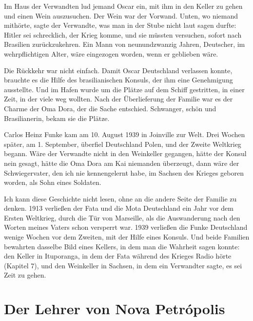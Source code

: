 \documentclass[
  ngerman,
  11pt,
  openany]{book}
\begin{document}
Im Haus der Verwandten lud jemand Oscar ein, mit ihm in den Keller zu
gehen und einen Wein auszusuchen. Der Wein war der Vorwand. Unten, wo
niemand mithörte, sagte der Verwandte, was man in der Stube nicht laut
sagen durfte: Hitler sei schrecklich, der Krieg komme, und sie müssten
versuchen, sofort nach Brasilien zurückzukehren. Ein Mann von
neunundzwanzig Jahren, Deutscher, im wehrpflichtigen Alter, wäre
eingezogen worden, wenn er geblieben wäre.

Die Rückkehr war nicht einfach. Damit Oscar Deutschland verlassen
konnte, brauchte es die Hilfe des brasilianischen Konsuls, der ihm eine
Genehmigung ausstellte. Und im Hafen wurde um die Plätze auf dem Schiff
gestritten, in einer Zeit, in der viele weg wollten. Nach der
Überlieferung der Familie war es der Charme der Oma Dora, der die Sache
entschied. Schwanger, schön und Brasilianerin, bekam sie die Plätze.

Carlos Heinz Funke kam am 10. August 1939 in Joinville zur Welt. Drei
Wochen später, am 1. September, überfiel Deutschland Polen, und der
Zweite Weltkrieg begann. Wäre der Verwandte nicht in den Weinkeller
gegangen, hätte der Konsul nein gesagt, hätte die Oma Dora am Kai
niemanden überzeugt, dann wäre der Schwiegervater, den ich nie
kennengelernt habe, im Sachsen des Krieges geboren worden, als Sohn
eines Soldaten.

Ich kann diese Geschichte nicht lesen, ohne an die andere Seite der
Familie zu denken. 1913 verließen der Fata und die Mota Deutschland ein
Jahr vor dem Ersten Weltkrieg, durch die Tür von Marseille, als die
Auswanderung nach den Worten meines Vaters schon versperrt war. 1939
verließen die Funke Deutschland wenige Wochen vor dem Zweiten, mit der
Hilfe eines Konsuls. Und beide Familien bewahrten dasselbe Bild eines
Kellers, in dem man die Wahrheit sagen konnte: den Keller in Ituporanga,
in dem der Fata während des Krieges Radio hörte (Kapitel 7), und den
Weinkeller in Sachsen, in dem ein Verwandter sagte, es sei Zeit zu
gehen.

\section{Der Lehrer von Nova
Petrópolis}\label{der-lehrer-von-nova-petruxf3polis}
\end{document}
